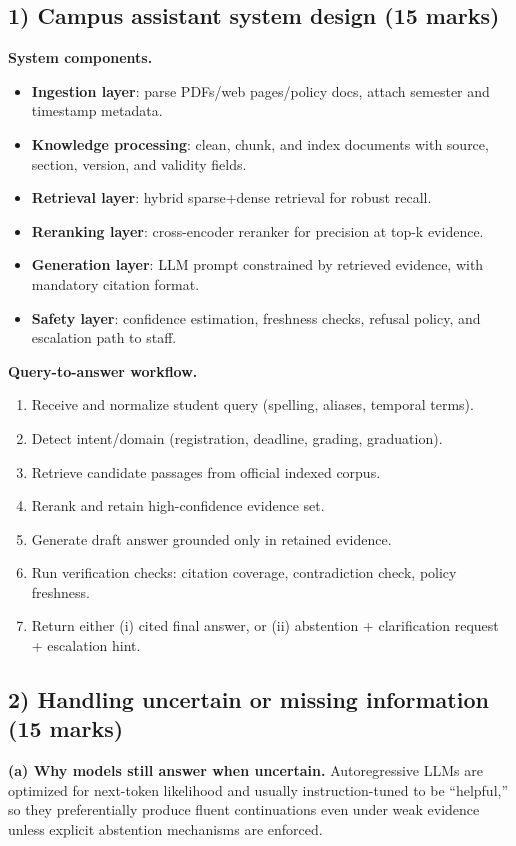 \documentclass[12pt]{article}
\begin{document}
\subsection*{1) Campus assistant system design (15 marks)}
\textbf{System components.}
\begin{itemize}[leftmargin=1.2em]
    \item \textbf{Ingestion layer}: parse PDFs/web pages/policy docs, attach semester and timestamp metadata.
    \item \textbf{Knowledge processing}: clean, chunk, and index documents with source, section, version, and validity fields.
    \item \textbf{Retrieval layer}: hybrid sparse+dense retrieval for robust recall.
    \item \textbf{Reranking layer}: cross-encoder reranker for precision at top-k evidence.
    \item \textbf{Generation layer}: LLM prompt constrained by retrieved evidence, with mandatory citation format.
    \item \textbf{Safety layer}: confidence estimation, freshness checks, refusal policy, and escalation path to staff.
\end{itemize}

\textbf{Query-to-answer workflow.}
\begin{enumerate}[leftmargin=1.5em]
    \item Receive and normalize student query (spelling, aliases, temporal terms).
    \item Detect intent/domain (registration, deadline, grading, graduation).
    \item Retrieve candidate passages from official indexed corpus.
    \item Rerank and retain high-confidence evidence set.
    \item Generate draft answer grounded only in retained evidence.
    \item Run verification checks: citation coverage, contradiction check, policy freshness.
    \item Return either (i) cited final answer, or (ii) abstention + clarification request + escalation hint.
\end{enumerate}

\subsection*{2) Handling uncertain or missing information (15 marks)}
\textbf{(a) Why models still answer when uncertain.}
Autoregressive LLMs are optimized for next-token likelihood and usually instruction-tuned to be ``helpful,'' so they preferentially produce fluent continuations even under weak evidence unless explicit abstention mechanisms are enforced.
\end{document}
